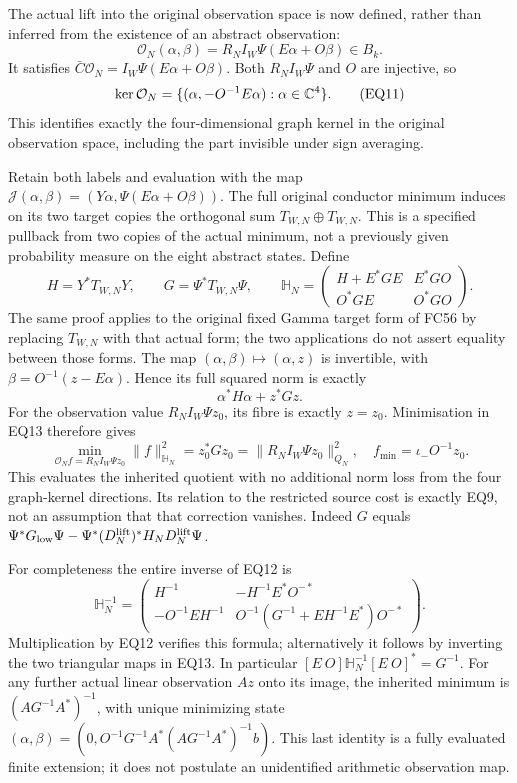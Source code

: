The actual lift into the original observation space is now defined,
rather than inferred from the existence of an abstract observation:
\[
 \mathcal O_N(\alpha,\beta)=R_NI_W\Psi(E\alpha+O\beta)\in B_k.
                                                                    \tag{EQ10}
\]
It satisfies $\bar C\mathcal O_N=I_W\Psi(E\alpha+O\beta)$.
Both $R_NI_W\Psi$ and $O$ are injective, so
\[
 \ker\mathcal O_N=\{(\alpha,-O^{-1}E\alpha):\alpha\in\mathbb C^4\}.
                                                                    \tag{EQ11}
\]
This identifies exactly the four-dimensional graph kernel in the
original observation space, including the part invisible under sign
averaging.

Retain both labels and evaluation with the map
$\mathcal J(\alpha,\beta)=(Y\alpha,\Psi(E\alpha+O\beta))$.
The full original conductor minimum induces on its two target copies
the orthogonal sum $T_{W,N}\oplus T_{W,N}$. This is a specified
pullback from two copies of the actual minimum, not a previously
given probability measure on the eight abstract states. Define
\[
 H=Y^*T_{W,N}Y,\qquad G=\Psi^*T_{W,N}\Psi,
 \qquad
 \mathbb H_N=\begin{pmatrix}
 H+E^*GE&E^*GO\\O^*GE&O^*GO
 \end{pmatrix}.                                                     \tag{EQ12}
\]
The same proof applies to the original fixed Gamma target form
of FC56 by replacing $T_{W,N}$ with that actual form; the two
applications do not assert equality between those forms.
The map $(\alpha,\beta)\mapsto(\alpha,z)$ is invertible, with
$\beta=O^{-1}(z-E\alpha)$. Hence its full squared norm is exactly
\[
 \alpha^*H\alpha+z^*Gz.                                             \tag{EQ13}
\]
For the observation value $R_NI_W\Psi z_0$, its fibre is exactly
$z=z_0$. Minimisation in EQ13 therefore gives
\[
 \boxed{\min_{\mathcal O_N f=R_NI_W\Psi z_0}\|f\|_{\mathbb H_N}^2
       =z_0^*Gz_0=\|R_NI_W\Psi z_0\|_{Q_N}^2,\quad
       f_{\min}=\iota_-O^{-1}z_0.}                                  \tag{EQ14}
\]
This evaluates the inherited quotient with no additional norm loss
from the four graph-kernel directions. Its relation to the restricted
source cost is exactly EQ9, not an assumption that that correction
vanishes. Indeed $G$ equals
$\Psi^*G_{\rm low}\Psi-\Psi^*(D_N^{\rm lift})^*H_ND_N^{\rm lift}\Psi$.

For completeness the entire inverse of EQ12 is
\[
 \mathbb H_N^{-1}=
 \begin{pmatrix}
 H^{-1}&-H^{-1}E^*O^{-*}\\
 -O^{-1}EH^{-1}&O^{-1}(G^{-1}+EH^{-1}E^*)O^{-*}
 \end{pmatrix}.                                                     \tag{EQ15}
\]
Multiplication by EQ12 verifies this formula; alternatively it
follows by inverting the two triangular maps in EQ13.
In particular $[E\ O]\mathbb H_N^{-1}[E\ O]^*=G^{-1}$.
For any further actual linear observation $A z$ onto its image,
the inherited minimum is $(AG^{-1}A^*)^{-1}$, with unique minimizing
state $(\alpha,\beta)=(0,O^{-1}G^{-1}A^*(AG^{-1}A^*)^{-1}b)$.
This last identity is a fully evaluated finite extension; it does not
postulate an unidentified arithmetic observation map.

